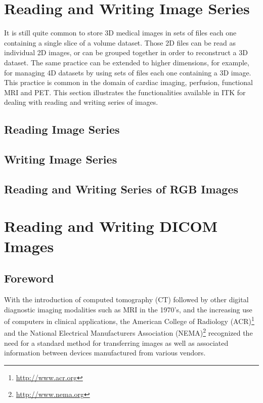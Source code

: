\section{Reading and Writing Image Series}

It is still quite common to store 3D medical images in sets of files each one
containing a single slice of a volume dataset. Those 2D files can be read as
individual 2D images, or can be grouped together in order to reconstruct a 3D
dataset. The same practice can be extended to higher dimensions, for example,
for managing 4D datasets by using sets of files each one containing a 3D image.
This practice is common in the domain of cardiac imaging, perfusion, functional
MRI and PET. This section illustrates the functionalities available in ITK for
dealing with reading and writing series of images.


\subsection{Reading Image Series}
\label{sec:ReadingImageSeries}


\subsection{Writing Image Series}
\label{sec:WritingImageSeries}


\subsection{Reading and Writing Series of RGB Images}
\label{sec:ReadingWritingRGBImageSeries}



\section{Reading and Writing DICOM Images}
\label{sec:ReadingDicomImageSeries2}


\subsection{Foreword}
With the introduction of computed tomography (CT) followed by other digital
diagnostic imaging modalities such as MRI in the 1970's, and the increasing use
of computers in clinical applications, the American College of Radiology
(ACR)\footnote{\url{http://www.acr.org}} and the National Electrical
Manufacturers Association (NEMA)\footnote{\url{http://www.nema.org}} recognized
the need for a standard method for transferring images as well as associated
information between devices manufactured from various vendors.

